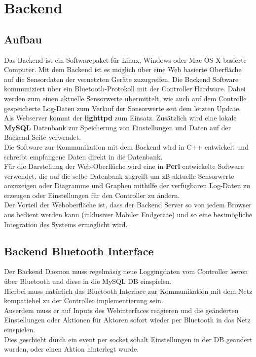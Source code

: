 \documentclass[12pt,a4paper]{article}
\begin{document}
\section{Backend}

\subsection{Aufbau}

Das Backend ist ein Softwarepaket für Linux, Windows oder Mac OS X basierte Computer. Mit dem Backend ist es möglich über eine Web basierte Oberfläche auf die Sensordaten der vernetzten Geräte zuzugreifen. Die Backend Software kommuniziert über ein Bluetooth-Protokoll mit der Controller Hardware. Dabei werden zum einen aktuelle Sensorwerte übermittelt, wie auch auf dem Controlle gespeicherte Log-Daten zum Verlauf der Sonsorwerte seit dem letzten Update.\\
Als Webserver kommt der {\bf lighttpd} zum Einsatz. Zusätzlich wird eine lokale {\bf MySQL} Datenbank zur Speicherung von Einstellungen und Daten auf der Backend-Seite verwendet.\\
Die Software zur Kommunikation mit dem Backend wird in C++ entwickelt und schreibt empfangene Daten direkt in die Datenbank.\\
Für die Darstellung der Web-Oberfläche wird eine in {\bf Perl} entwickelte Software verwendet, die auf die selbe Datenbank zugreift um zB aktuelle Sensorwerte anzuzeigen oder Diagramme und Graphen mithilfe der verfügbaren Log-Daten zu erzeugen oder Einstellungen für den Controller zu ändern.\\
Der Vorteil der Weboberfläche ist, dass der Backend Server so von jedem Browser aus bedient werden kann (inklusiver Mobiler Endgeräte) und so eine bestmögliche Integration des Systems ermöglicht wird.

\subsection{Backend Bluetooth Interface}

Der Backend Daemon muss regelmäsig neue Loggingdaten vom Controller leeren über Bluetooth und diese in die MySQL DB einspielen.\\
Hierbei muss natürlich das Bluetooth Interface zur Kommunikation mit dem Netz kompatiebel zu der Controller implementierung sein.\\
Auserdem muss er auf Inputs des Webinterfaces reagieren und die geänderten Einstellungen oder Aktionen für Aktoren sofort wieder per Bluetooth in das Netz einspielen.\\
Dies geschieht durch ein event per socket sobalt Einstellungen in der DB geändert wurden, oder einen Aktion hinterlegt wurde.\\
\end{document}
